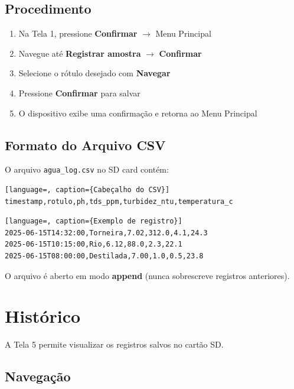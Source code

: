 \documentclass[12pt,a4paper]{article}
\begin{document}
\subsection{Procedimento}

\begin{enumerate}[nosep]
  \item Na Tela 1, pressione \textbf{Confirmar} $\rightarrow$ Menu Principal
  \item Navegue até \textbf{Registrar amostra} $\rightarrow$ \textbf{Confirmar}
  \item Selecione o rótulo desejado com \textbf{Navegar}
  \item Pressione \textbf{Confirmar} para salvar
  \item O dispositivo exibe uma confirmação e retorna ao Menu Principal
\end{enumerate}

\subsection{Formato do Arquivo CSV}

O arquivo \texttt{agua\_log.csv} no SD card contém:

\begin{lstlisting}[language=, caption={Cabeçalho do CSV}]
timestamp,rotulo,ph,tds_ppm,turbidez_ntu,temperatura_c
\end{lstlisting}

\begin{lstlisting}[language=, caption={Exemplo de registro}]
2025-06-15T14:32:00,Torneira,7.02,312.0,4.1,24.3
2025-06-15T10:15:00,Rio,6.12,88.0,2.3,22.1
2025-06-15T08:00:00,Destilada,7.00,1.0,0.5,23.8
\end{lstlisting}

O arquivo é aberto em modo \textbf{append} (nunca sobrescreve registros anteriores).

\section{Histórico}

A Tela 5 permite visualizar os registros salvos no cartão SD.

\subsection{Navegação}
\end{document}
